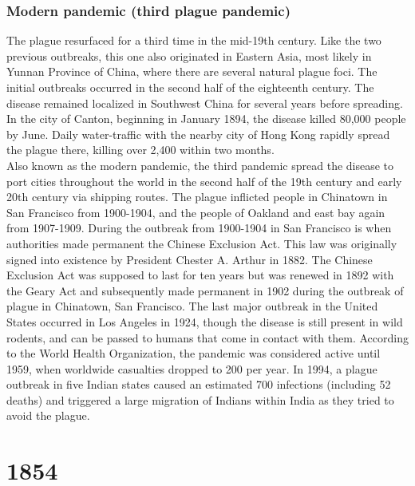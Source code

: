 \documentclass[11pt]{report}
\begin{document}
\subsection{Modern pandemic (third plague pandemic)}
The plague resurfaced for a third time in the mid-19th century. Like the two previous outbreaks, this one also originated in Eastern Asia, most likely in Yunnan Province of China, where there are several natural plague foci. The initial outbreaks occurred in the second half of the eighteenth century. The disease remained localized in Southwest China for several years before spreading. In the city of Canton, beginning in January 1894, the disease killed 80,000 people by June. Daily water-traffic with the nearby city of Hong Kong rapidly spread the plague there, killing over 2,400 within two months.\\
Also known as the modern pandemic, the third pandemic spread the disease to port cities throughout the world in the second half of the 19th century and early 20th century via shipping routes. The plague inflicted people in Chinatown in San Francisco from 1900-1904, and the people of Oakland and east bay again from 1907-1909. During the outbreak from 1900-1904 in San Francisco is when authorities made permanent the Chinese Exclusion Act. This law was originally signed into existence by President Chester A. Arthur in 1882. The Chinese Exclusion Act was supposed to last for ten years but was renewed in 1892 with the Geary Act and subsequently made permanent in 1902 during the outbreak of plague in Chinatown, San Francisco. The last major outbreak in the United States occurred in Los Angeles in 1924, though the disease is still present in wild rodents, and can be passed to humans that come in contact with them. According to the World Health Organization, the pandemic was considered active until 1959, when worldwide casualties dropped to 200 per year. In 1994, a plague outbreak in five Indian states caused an estimated 700 infections (including 52 deaths) and triggered a large migration of Indians within India as they tried to avoid the plague.

\chapter{1854}
\section{}
\end{document}
